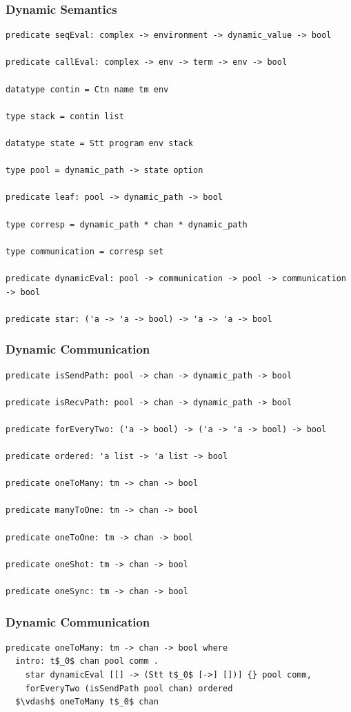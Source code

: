 \documentclass{beamer}
\begin{document}
\begin{frame}[fragile]
\frametitle{Dynamic Semantics}
\begin{lstlisting}[language=logic, mathescape]
predicate seqEval: complex -> environment -> dynamic_value -> bool 

predicate callEval: complex -> env -> term -> env -> bool 

datatype contin = Ctn name tm env

type stack = contin list

datatype state = Stt program env stack 

type pool = dynamic_path -> state option

predicate leaf: pool -> dynamic_path -> bool

type corresp = dynamic_path * chan * dynamic_path

type communication = corresp set 

predicate dynamicEval: pool -> communication -> pool -> communication -> bool

predicate star: ('a -> 'a -> bool) -> 'a -> 'a -> bool 
\end{lstlisting}
\end{frame}


\begin{frame}[fragile]
	\frametitle{Dynamic Communication}
\begin{lstlisting}[language=logic, mathescape]
predicate isSendPath: pool -> chan -> dynamic_path -> bool 

predicate isRecvPath: pool -> chan -> dynamic_path -> bool

predicate forEveryTwo: ('a -> bool) -> ('a -> 'a -> bool) -> bool

predicate ordered: 'a list -> 'a list -> bool

predicate oneToMany: tm -> chan -> bool

predicate manyToOne: tm -> chan -> bool

predicate oneToOne: tm -> chan -> bool

predicate oneShot: tm -> chan -> bool

predicate oneSync: tm -> chan -> bool
\end{lstlisting}
\end{frame}

\begin{frame}[fragile]
	\frametitle{Dynamic Communication}
\begin{lstlisting}[language=logic, mathescape]
predicate oneToMany: tm -> chan -> bool where
  intro: t$_0$ chan pool comm .
    star dynamicEval [[] -> (Stt t$_0$ [->] [])] {} pool comm,
    forEveryTwo (isSendPath pool chan) ordered
  $\vdash$ oneToMany t$_0$ chan
\end{lstlisting}
\end{frame}
\end{document}
